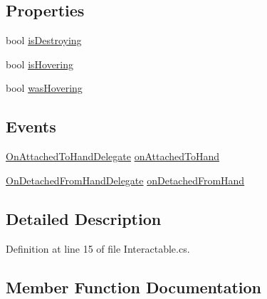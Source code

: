 \subsection*{Properties}
\begin{DoxyCompactItemize}
\item 
bool \mbox{\hyperlink{class_valve_1_1_v_r_1_1_interaction_system_1_1_interactable_add1caee2e4a31ce4cbbbf345a7f1e794}{is\+Destroying}}
\item 
bool \mbox{\hyperlink{class_valve_1_1_v_r_1_1_interaction_system_1_1_interactable_aded7f16cb07fa8238e399ea8d69f8c28}{is\+Hovering}}
\item 
bool \mbox{\hyperlink{class_valve_1_1_v_r_1_1_interaction_system_1_1_interactable_aca11ae1746a8c3f61fc1e4a5223c8862}{was\+Hovering}}
\end{DoxyCompactItemize}
\subsection*{Events}
\begin{DoxyCompactItemize}
\item 
\mbox{\hyperlink{class_valve_1_1_v_r_1_1_interaction_system_1_1_interactable_a3ec0150eb5701a6782f6dc07c9ddd1a0}{On\+Attached\+To\+Hand\+Delegate}} \mbox{\hyperlink{class_valve_1_1_v_r_1_1_interaction_system_1_1_interactable_a93c512ea325e910f4810fe4fb126f2c0}{on\+Attached\+To\+Hand}}
\item 
\mbox{\hyperlink{class_valve_1_1_v_r_1_1_interaction_system_1_1_interactable_abbbcb1950b93f7b9fcbbddc464b88d93}{On\+Detached\+From\+Hand\+Delegate}} \mbox{\hyperlink{class_valve_1_1_v_r_1_1_interaction_system_1_1_interactable_a3c06e1a11432b5aa3046bb336a1e40f4}{on\+Detached\+From\+Hand}}
\end{DoxyCompactItemize}


\subsection{Detailed Description}


Definition at line 15 of file Interactable.\+cs.



\subsection{Member Function Documentation}
\mbox{\label{class_valve_1_1_v_r_1_1_interaction_system_1_1_interactable_ae90583dd7a15aecc2cdb8b1640c6ac44}} 

